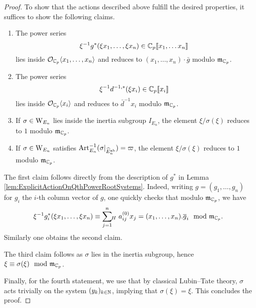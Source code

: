 \documentclass[../main.tex]{subfiles}
\begin{document}
\begin{proof}
To show that the actions described above fulfill the desired properties, it suffices
to show the following claims.
\begin{enumerate}
  \item The power series 
    $$\xi^{-1}g^*(\xi x_1, \dots, \xi x_n) \in {\mathbb{C}_p}\llbracket x_1, \dots x_n \rrbracket$$
    lies inside $\mathcal{O}_{\mathbb{C}_p} \langle x_1, \dots, x_n \rangle$ and reduces to $(x_1,
    \dots, x_n)\cdot \bar g$ modulo $\mathfrak{m}_{\mathbb{C}_p}$.
  \item The power series 
    \begin{equation*}
      \xi^{-1} d^{-1, *} (\xi x_i) \in {\mathbb{C}_p} \llbracket x_i\rrbracket 
    \end{equation*}
    lies inside $\mathcal{O}_{\mathbb{C}_p} \langle x_i \rangle$ and reduces to $\bar d^{-1} x_i$
    modulo $\mathfrak{m}_{\mathbb{C}_p}$. 
  \item If $\sigma \in \mathrm W_{E_n}$ lies inside the inertia subgroup $I_{E_n}$,
    the element
    $\xi/\sigma(\xi)$ reduces to $1$ modulo $\mathfrak{m}_{\mathbb{C}_p}$.
  \item If $\sigma \in \mathrm W_{E_n}$ satisfies $\mathrm{Art}^{-1}_{E_n}(\sigma|_{\widehat
    E_n^{\mathrm{ab}}}) = \varpi$, the element
    $\xi/\sigma(\xi)$ reduces to $1$ modulo $\mathfrak{m}_{\mathbb{C}_p}$. 
\end{enumerate}
The first claim follows directly from the description of $g^*$ in
Lemma \ref{lem:ExplicitActionOnQthPowerRootSystems}. Indeed, writing $g = (g_1,
\dots, g_n)$ for $g_i$ the $i$-th column vector of $g$, one quickly checks that modulo
$\mathfrak{m}_{\mathbb{C}_p}$, we have 
$$\xi^{-1} g_i^*(\xi x_1, \dots, \xi x_n) \equiv \sum_{j=1}^n {\hspace{-3pt}}_H\hspace{3pt}
a_{ij}^{(0)} x_j = (x_1, \dots, x_n).\overline g_i \mod {\mathfrak{m}}_{\mathbb{C}_p}.$$ 
Similarly one obtains the second claim.

The third claim follows as $\sigma$ lies in the inertia subgroup,
hence $\xi \equiv \sigma(\xi) \mod {\mathfrak{m}}_{\mathbb{C}_p}$.

Finally, for the fourth statement, we use that by classical Lubin--Tate theory, $\sigma$
acts trivially on the system
$(y_k)_{k\in \mathbb{N}}$, implying that $\sigma(\xi) = \xi$.
This concludes the proof.
\end{proof}
\end{document}
